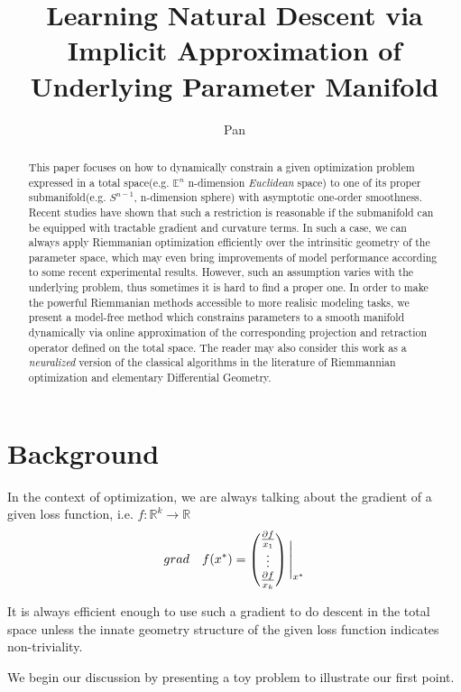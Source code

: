 \documentclass[letterpaper]{article}
\title{Learning Natural Descent via Implicit Approximation of Underlying Parameter Manifold}
\author{Pan}
\begin{document}
\maketitle
\begin{abstract}
  This paper focuses on how to dynamically constrain a given optimization problem expressed in a total space(e.g. $\mathbb{E}^n$ n-dimension \textit{Euclidean} space) to one of its proper submanifold(e.g. $S^{n-1}$, n-dimension sphere) with asymptotic one-order smoothness.
  Recent studies have shown that such a restriction is reasonable if the submanifold can be equipped with tractable gradient and curvature terms. In such a case, we can always
  apply Riemmanian optimization efficiently over the intrinsitic geometry of the parameter space, which may even bring improvements of model performance according to some recent experimental results. However, such an assumption
  varies with the underlying problem, thus sometimes it is hard to find a proper one. In order to make the powerful Riemmanian methods accessible to more realisic modeling tasks, we present a model-free method which constrains
  parameters to a smooth manifold dynamically via online approximation of the corresponding projection and retraction operator defined on the total space. The reader may also consider this work as a \textit{neuralized} version of the
  classical algorithms in the literature of Riemmannian optimization and elementary Differential Geometry.
\end{abstract}

\section{Background}
In the context of optimization, we are always talking about the gradient of a given loss function, i.e. $f:\mathbb{R}^k\to{\mathbb{R}}$
$$
grad\quad f(x^{*})=  \begin{pmatrix}
  \frac{\partial{f}}{x_1} \\
  \vdots \\
  \frac{\partial{f}}{x_k} \\
\end{pmatrix}\Bigg{|}_{x^{*}}
$$

It is always efficient enough to use such a gradient to do descent in the total space unless the innate geometry structure of the given loss function indicates non-triviality.

We begin our discussion by presenting a toy problem to illustrate our first point.
\end{document}
